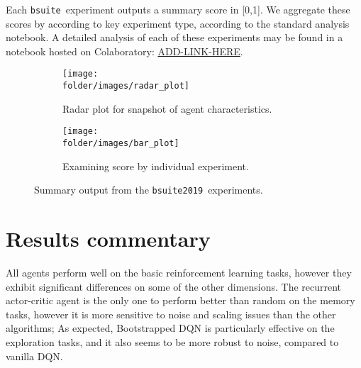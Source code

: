 \documentclass[11pt]{article}
\newcommand{\shortname}{\texttt{bsuite}}
\newcommand{\version}{\texttt{bsuite2019}}
\newcommand{\fullreport}{\url{ADD-LINK-HERE}}
\begin{document}
Each \shortname\ experiment outputs a summary score in [0,1].
We aggregate these scores by according to key experiment type, according to the standard analysis notebook.
A detailed analysis of each of these experiments may be found in a notebook hosted on Colaboratory: \fullreport.


\begin{figure}[h!]
\centering
\begin{subfigure}{.45\textwidth}
  \centering
  \texttt{[image: \\folder/images/radar\_plot]}
  \caption{Radar plot for snapshot of agent characteristics.}
  \label{fig:memory_len_score}
\end{subfigure}
\hspace{10mm}
\begin{subfigure}{.45\textwidth}
  \centering
  \texttt{[image: \\folder/images/bar\_plot]}
  \caption{Examining score by individual experiment.}
  \label{fig:memory_len_scaling}
\end{subfigure}
\caption{Summary output from the \version\  experiments.}
\label{fig:test}
\end{figure}


\section{Results commentary}
All agents perform well on the basic reinforcement learning tasks, however they
exhibit significant differences on some of the other dimensions. The recurrent
actor-critic agent is the only one to perform better than random on the memory
tasks, however it is more sensitive to noise and scaling issues than the other
algorithms; As expected, Bootstrapped DQN is particularly effective on the
exploration tasks, and it also seems to be more robust to noise, compared to
vanilla DQN.


\newpage
{
\small


}
\end{document}
